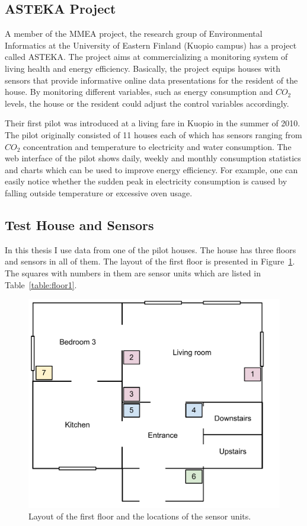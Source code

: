 \subsection{ASTEKA Project}
A member of the MMEA project, the research group of Environmental Informatics at the University of Eastern Finland (Kuopio campus) has a project called ASTEKA. The project aims at commercializing a monitoring system of living health and energy efficiency. \cite{Asteka10} Basically, the project equips houses with sensors that provide informative online data presentations for the resident of the house. By monitoring different variables, such as energy consumption and $CO_2$ levels, the house or the resident could adjust the control variables accordingly. 

Their first pilot was introduced at a living fare in Kuopio in the summer of 2010. The pilot originally consisted of 11 houses each of which has sensors ranging from $CO_2$ concentration and temperature to electricity and water consumption. The web interface of the pilot shows daily, weekly and monthly consumption statistics and charts which can be used to improve energy efficiency. \cite{Asteka10} For example, one can easily notice whether the sudden peak in electricity consumption is caused by falling outside temperature or excessive oven usage.


\subsection{Test House and Sensors}
In this thesis I use data from one of the pilot houses. The house has three floors and sensors in all of them. The layout of the first floor is presented in Figure~\ref{fig:floor1}. The squares with numbers in them are sensor units which are listed in Table~\ref{table:floor1}.

\begin{figure}[here]
\centering
\includegraphics[scale=0.7]{images/keskikerros.pdf}
\caption{Layout of the first floor and the locations of the sensor units.}
\label{fig:floor1}
\end{figure}

